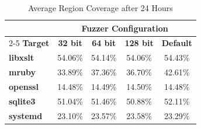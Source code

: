 \begin{table}[htbp]
    \centering
    \begin{tabular}{@{}l cccc @{}}
        \toprule
        & \multicolumn{4}{c}{\textbf{Fuzzer Configuration}} \\
        \cmidrule(l){2-5}
        \textbf{Target} & \textbf{32 bit} & \textbf{64 bit} & \textbf{128 bit} & \textbf{Default} \\
        \midrule
        \textbf{libxslt} & 54.06\% & 54.14\% & 54.06\% & 54.43\% \\
        \textbf{mruby}   & 33.89\% & 37.36\% & 36.70\% & 42.61\% \\
        \textbf{openssl} & 14.48\% & 14.49\% & 14.50\% & 14.48\% \\
        \textbf{sqlite3} & 51.04\% & 51.46\% & 50.88\% & 52.11\% \\
        \textbf{systemd} & 23.10\% & 23.57\% & 23.58\% & 23.29\% \\
        \bottomrule
    \end{tabular}
    \caption{Average Region Coverage after 24 Hours}
    \label{tab:region_coverage}
\end{table}
